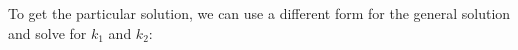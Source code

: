 \documentclass[preview]{standalone}
\begin{document}
\begin{center}
To get the particular solution, we can use a different form for the general solution \\
                and solve for $k_1$ and $k_2$:
\end{center}
\end{document}
